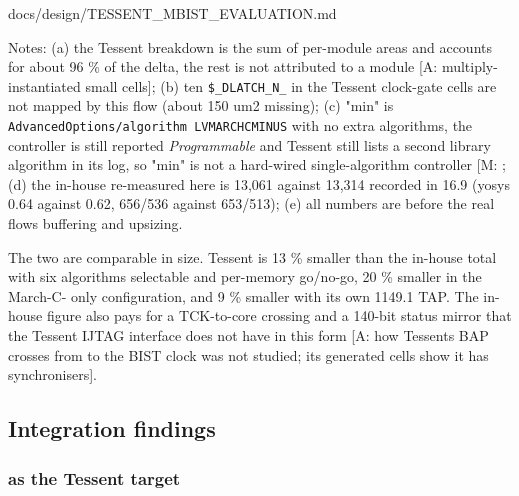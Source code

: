\begin{relocated}{docs/design/TESSENT_MBIST_EVALUATION.md}
{}

Notes: (a) the Tessent breakdown is the sum of per-module areas and
accounts for about 96 \% of the delta, the rest is not attributed to a
module {[}A: multiply-instantiated small cells{]}; (b) ten
\texttt{\$\_\allowbreak{}DLATCH\_\allowbreak{}N\_\allowbreak{}} in the
Tessent clock-gate cells are not mapped by this flow (about 150 um2
missing); (c) "min" is
\texttt{AdvancedOptions/\allowbreak{}algorithm\ LVMARCHCMINUS} with no
extra algorithms, the controller is still reported \emph{Programmable}
and Tessent still lists a second library algorithm in its log, so "min"
is not a hard-wired single-algorithm controller {[}M:
\code{evidence/generation/min_c1.generation_log}{]}; (d) the in-house
 re-measured here is 13,061 against 13,314 recorded in
16.9 (yosys 0.64 against 0.62,  656/536 against
653/513); (e) all numbers are before the real flow\textquotesingle s
buffering and upsizing.

The two are comparable in size. Tessent is 13 \% smaller than the
in-house total with six algorithms selectable and per-memory go/no-go,
20 \% smaller in the March-C- only configuration, and 9 \% smaller with
its own 1149.1 TAP. The in-house figure also pays for a TCK-to-core
crossing and a 140-bit status mirror that the Tessent IJTAG interface
does not have in this form {[}A: how Tessent\textquotesingle s BAP
crosses from  to the BIST clock was not studied; its
generated  cells show it has
synchronisers{]}.

\subsection{Integration findings}\label{tm:dec:tessent-mbist-evaluation:7-integration-findings}

\subsubsection{\texorpdfstring{ as the Tessent
target}{as the Tessent target}}\label{tm:dec:tessent-mbist-evaluation:71-soc-top-as-the-tessent-target}


\end{relocated}
